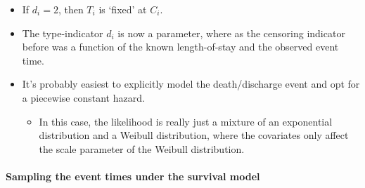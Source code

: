 \documentclass[
  10pt,
  a4paper,
]{article}
\providecommand{\tightlist}{%
  \setlength{\itemsep}{0pt}\setlength{\parskip}{0pt}}
\begin{document}
\begin{itemize}
\tightlist
\item
  If \(d_{i} = 2\), then \(T_{i}\) is `fixed' at \(C_{i}\).
\item
  The type-indicator \(d_{i}\) is now a parameter, where as the
  censoring indicator before was a function of the known length-of-stay
  and the observed event time.
\item
  It's probably easiest to explicitly model the death/discharge event
  and opt for a piecewise constant hazard.

  \begin{itemize}
  \tightlist
  \item
    In this case, the likelihood is really just a mixture of an
    exponential distribution and a Weibull distribution, where the
    covariates only affect the scale parameter of the Weibull
    distribution.
  \end{itemize}
\end{itemize}

\hypertarget{sampling-the-event-times-under-the-survival-model}{%
\paragraph{Sampling the event times under the survival
model}\label{sampling-the-event-times-under-the-survival-model}}
\end{document}
